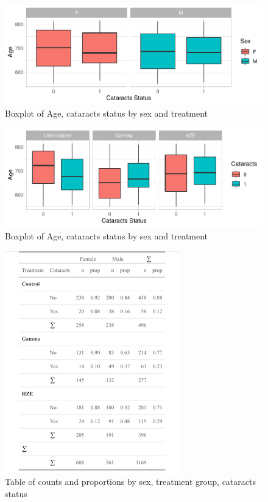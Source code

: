 \documentclass[12pt]{article}
\begin{document}
\begin{figure}[H]

{\centering \includegraphics[width=0.5\linewidth]{bookdown_report_files/figure-latex/scage-1} 

}

\caption{Boxplot of Age, cataracts status by sex and treatment}\label{fig:scage-1}
\end{figure}
\begin{figure}[H]

{\centering \includegraphics[width=0.5\linewidth]{bookdown_report_files/figure-latex/scage-2} 

}

\caption{Boxplot of Age, cataracts status by sex and treatment}\label{fig:scage-2}
\end{figure}

\begin{figure}[H]

{\centering \includegraphics[width=0.5\linewidth]{ct_prop} 

}

\caption{Table of counts and proportions by sex, treatment group, cataracts status}\label{fig:ctprop}
\end{figure}
\end{document}
